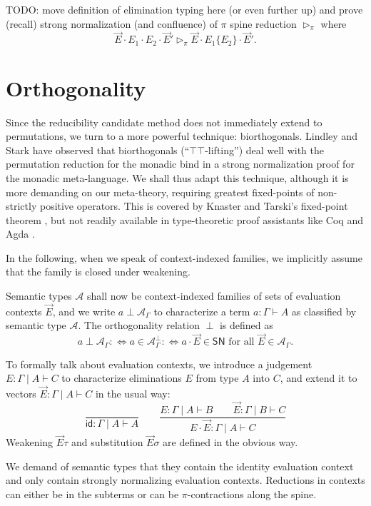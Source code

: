 \documentclass[a4paper,USenglish,cleveref, autoref, thm-restate]{lipics-v2019}
\newcommand{\defiff}{\mathrel{{{:}{\Longleftrightarrow}}}}
\newcommand{\tid}{\mathsf{id}}
\newcommand{\ru}{\dfrac}
\newcommand{\whd}[1][]{\rhd_{#1}}
\newcommand{\A}{\mathcal{A}}
\newcommand{\SN}{\mathsf{SN}}
\begin{document}
TODO: move definition of elimination typing here (or even further up) and
prove (recall) strong normalization (and confluence) of $\pi$ spine
reduction $\whd[\pi]$ where
\[
  \vec E \cdot E_1 \cdot E_2 \cdot \vec E'
  \whd[\pi]
 \vec E \cdot E_1\{E_2\} \cdot \vec E'
 .
\]

\section{Orthogonality}
\label{sec:biortho}
\label{sec:ortho}

Since the reducibility candidate method does not immediately extend to
permutations, we turn to a more powerful technique: biorthogonals.
Lindley and Stark \cite{lindleyStark:redComput} have observed that
biorthogonals (``$\top\top$-lifting'') deal well with the permutation
reduction for the monadic bind in a strong normalization proof for the
monadic meta-language.  We shall thus adapt this technique, although
it is more demanding on our meta-theory, requiring greatest
fixed-points of non-strictly positive operators.  This is covered by
Knaster and Tarski's fixed-point theorem \cite{tarski:fixpoint}, but
not readily available in type-theoretic proof assistants like Coq
\cite{coq:8120} and
Agda \cite{agda:261}.

In the following, when we speak of context-indexed families, we
implicitly assume that the family is closed under weakening.

Semantic types $\A$ shall now be context-indexed families of sets of
evaluation contexts $\vec E$, and we write $a \perp \A_\Gamma$ to
characterize a term $a : \Gamma \vdash A$ as classified by semantic
type $\A$.  The orthogonality relation $\perp$ is defined as
\[
  a \perp \A_\Gamma \defiff
  a \in \A_\Gamma^\perp \defiff
  a \cdot \vec E \in \SN \mbox{ for all } \vec E \in \A_\Gamma
  .
\]

To formally talk about evaluation contexts, we introduce a judgement
$E : \Gamma \mid A \vdash C$ to characterize eliminations $E$ from type $A$
into $C$, and extend it to vectors $\vec E : \Gamma \mid A \vdash C$
in the usual way:
\[
  \ru{}{\tid : \Gamma \mid A \vdash A}
\qquad
  \ru{E : \Gamma \mid A \vdash B \qquad
      \vec E : \Gamma \mid B \vdash C
    }{E \cdot \vec E : \Gamma \mid A \vdash C}
\]
Weakening $\vec E \tau$ and substitution $\vec E \sigma$ are defined
in the obvious way.

We demand of semantic types that they contain the identity evaluation
context and only contain strongly normalizing evaluation contexts.
Reductions in contexts can either be in the subterms or can be
$\pi$-contractions along the spine.
\end{document}

